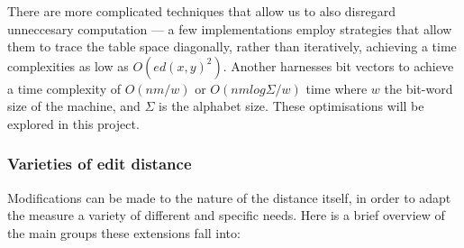 \documentclass[a4paper,11pt,twoside,notitlepage]{article}
\begin{document}
        There are more complicated techniques that allow us to also disregard
        unneccesary computation --- a few implementations employ
        strategies that allow them to trace the table space
        diagonally, rather than iteratively, achieving a
        time complexities as low as $O(ed(x, y)^2)$.\cite{Chang1992}
        Another harnesses bit vectors to achieve a time complexity of
        $O(nm/w)$ or $O(nm log {\Sigma}/w)$ time where $w$ the
        bit-word size of the machine, and $\Sigma$ is the alphabet
        size.\cite{Myers1999}\cite{Hyyro2003} These optimisations will
        be explored in this project.

        \subsubsection*{Varieties of edit distance}
        Modifications can be made to the nature of the distance
        itself, in order to adapt the measure a variety of different and
        specific needs. Here is a brief overview of the main groups
        these extensions fall into:
\end{document}
